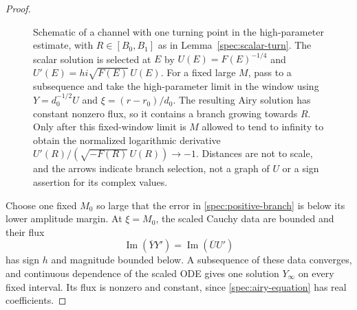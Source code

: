 \documentclass[11pt]{article}
\numberwithin{equation}{section}
\theoremstyle{definition}
\theoremstyle{remark}
\begin{document}
\begin{proof}
\begin{figure}[tbp]
{
  }
  \endgroup
  \caption{Schematic of a channel with one turning point in the
  high-parameter estimate, with $R\in[B_0,B_1]$ as in
  Lemma~\ref{spec:scalar-turn}. The scalar solution is selected at $E$ by
  $U(E)=F(E)^{-1/4}$ and $U'(E)=h i\sqrt{F(E)}\,U(E)$.
  For a fixed large $M$, pass to a subsequence and take the
  high-parameter limit in the window using $Y=d_0^{-1/2}U$
  and $\xi=(r-r_0)/d_0$.
  The resulting Airy solution has constant nonzero flux, so it contains
  a branch growing towards $R$.
  Only after this fixed-window limit is $M$ allowed to tend to infinity
  to obtain the normalized logarithmic derivative
  $U'(R)/(\sqrt{-F(R)}\,U(R))\to-1$.
  Distances are not to scale, and the arrows indicate branch selection,
  not a graph of $U$ or a sign assertion for its complex values.}
  \label{fig:turning}
\end{figure}


Choose one fixed $M_0$ so large that the error in
\eqref{spec:positive-branch} is below its lower amplitude margin.
At $\xi=M_0$, the scaled Cauchy data are bounded and their flux
\[
 \operatorname{Im}(\overline Y Y')
 =\operatorname{Im}(\overline U U')
\]
has sign $h$ and magnitude bounded below. A subsequence of these data
converges, and continuous dependence of the scaled ODE gives one
solution $Y_\infty$ on every fixed interval. Its flux is nonzero and
constant, since \eqref{spec:airy-equation} has real coefficients.


\end{proof}
\end{document}
